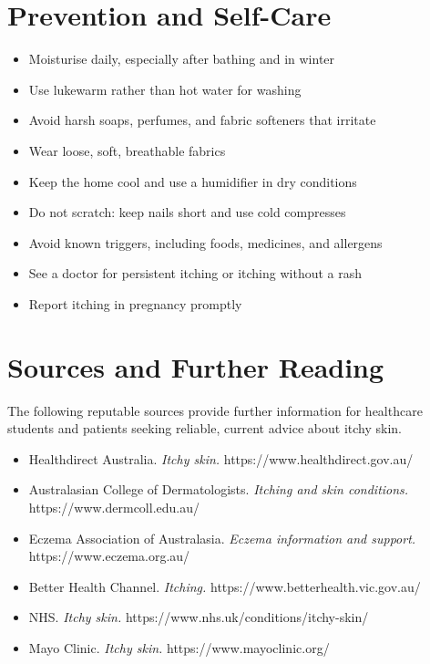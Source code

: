 \section*{Prevention and Self-Care}
\begin{itemize}
    \item Moisturise daily, especially after bathing and in winter
    \item Use lukewarm rather than hot water for washing
    \item Avoid harsh soaps, perfumes, and fabric softeners that irritate
    \item Wear loose, soft, breathable fabrics
    \item Keep the home cool and use a humidifier in dry conditions
    \item Do not scratch: keep nails short and use cold compresses
    \item Avoid known triggers, including foods, medicines, and allergens
    \item See a doctor for persistent itching or itching without a rash
    \item Report itching in pregnancy promptly
\end{itemize}

\section*{Sources and Further Reading}
The following reputable sources provide further information for healthcare students and patients seeking reliable, current advice about itchy skin.
\begin{itemize}
    \item Healthdirect Australia. \textit{Itchy skin.} https://www.healthdirect.gov.au/
    \item Australasian College of Dermatologists. \textit{Itching and skin conditions.} https://www.dermcoll.edu.au/
    \item Eczema Association of Australasia. \textit{Eczema information and support.} https://www.eczema.org.au/
    \item Better Health Channel. \textit{Itching.} https://www.betterhealth.vic.gov.au/
    \item NHS. \textit{Itchy skin.} https://www.nhs.uk/conditions/itchy-skin/
    \item Mayo Clinic. \textit{Itchy skin.} https://www.mayoclinic.org/
\end{itemize}
